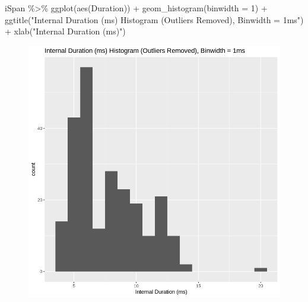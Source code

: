 \documentclass[
  letterpaper,
  DIV=11,
  numbers=noendperiod]{scrartcl}
\newenvironment{Shaded}{\begin{snugshade}}{\end{snugshade}}
\newcommand{\AttributeTok}[1]{\textcolor[rgb]{0.40,0.45,0.13}{#1}}
\newcommand{\CommentTok}[1]{\textcolor[rgb]{0.37,0.37,0.37}{#1}}
\newcommand{\DecValTok}[1]{\textcolor[rgb]{0.68,0.00,0.00}{#1}}
\newcommand{\FunctionTok}[1]{\textcolor[rgb]{0.28,0.35,0.67}{#1}}
\newcommand{\NormalTok}[1]{\textcolor[rgb]{0.00,0.23,0.31}{#1}}
\newcommand{\SpecialCharTok}[1]{\textcolor[rgb]{0.37,0.37,0.37}{#1}}
\newcommand{\StringTok}[1]{\textcolor[rgb]{0.13,0.47,0.30}{#1}}
\begin{document}
\begin{Shaded}
\begin{Highlighting}[]
\NormalTok{iSpan }\SpecialCharTok{\%\textgreater{}\%}
    \FunctionTok{ggplot}\NormalTok{(}\FunctionTok{aes}\NormalTok{(Duration)) }\SpecialCharTok{+} \FunctionTok{geom\_histogram}\NormalTok{(}\AttributeTok{binwidth =} \DecValTok{1}\NormalTok{) }\SpecialCharTok{+}
    \FunctionTok{ggtitle}\NormalTok{(}\StringTok{"Internal Duration (ms) Histogram (Outliers Removed), Binwidth = 1ms"}\NormalTok{) }\SpecialCharTok{+}
    \FunctionTok{xlab}\NormalTok{(}\StringTok{"Internal Duration (ms)"}\NormalTok{)}
\end{Highlighting}
\end{Shaded}

\begin{figure}[H]

{\centering \includegraphics{dss-span-analysis-rev5_files/figure-pdf/cell-56-output-1.png}

}

\end{figure}

\begin{Shaded}
\end{Shaded}
\end{document}
